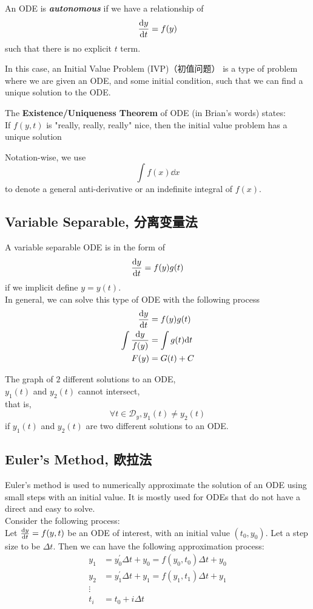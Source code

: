 \begin{definition}
    An ODE is \textbf{\textit{autonomous}} if we have a relationship of
    $$\dv{y}{t} = f(y)$$
    such that there is no explicit $t$ term.
\end{definition}
In this case, an Initial Value Problem (IVP)（初值问题） is a type of problem where we are given an ODE, and some initial condition, such that we can find a unique solution to the ODE. \\
\begin{theorem}
    The \textbf{Existence/Uniqueness Theorem} of ODE (in Brian's words) states: \\
    If $f(y, t)$ is "really, really, really" nice, then the initial value problem has a unique solution
\end{theorem}
Notation-wise, we use
$$\int f(x) \dd x$$
to denote a general anti-derivative or an indefinite integral of $f(x)$.

\subsection{Variable Separable, 分离变量法}
A variable separable ODE is in the form of
$$\dv{y}{t} = f(y)g(t)$$
if we implicit define $y=y(t)$. \\
In general, we can solve this type of ODE with the following process
\begin{align*}
    \dv{y}{t} &= f(y)g(t) \\
    \int \frac{\dd y}{f(y)} &= \int g(t) \dd t \\
    F(y) &= G(t) + C
\end{align*}
\begin{theorem}
    The graph of $2$ different solutions to an ODE, \\
    $y_1(t)$ and $y_2(t)$ cannot intersect, \\
    that is,
    $$\forall t \in \mathscr{D}_y, y_1(t) \ne y_2(t)$$
    if $y_1(t)$ and $y_2(t)$ are two different solutions to an ODE.
\end{theorem}
\newpage
\subsection{Euler's Method, 欧拉法}
Euler's method is used to numerically approximate the solution of an ODE using small steps with an initial value. It is mostly used for ODEs that do not have a direct and easy to solve. \\
Consider the following process: \\
Let $\dv{y}{t} = f(y, t)$ be an ODE of interest, with an initial value $(t_0, y_0)$. Let a step size to be $\Delta t$. Then we can have the following approximation process:
\begin{align*}
    y_1 &= y_0^{'} \Delta t + y_0 = f(y_0, t_0) \Delta t + y_0 \\
    y_2 &= y_1^{'} \Delta t + y_1 = f(y_1, t_1) \Delta t + y_1 \\
    \vdots \\
    t_i &= t_0 + i \Delta t
\end{align*}
